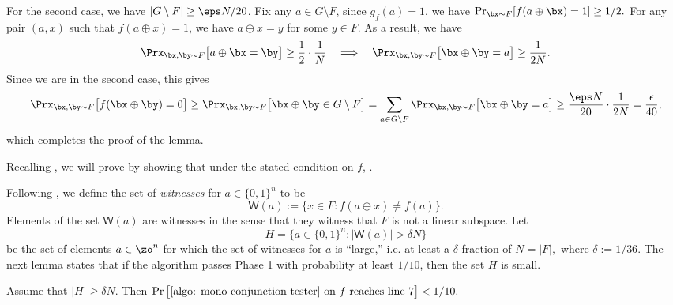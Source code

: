 \documentclass[11pt]{article}
\theoremstyle{definition}
\begin{document}
\begin{proofof}{}
For the second case, we have $|G \setminus F | \geq \eps N / 20$. Fix any $a \in G \setminus F $, since $g_f(a)=1$, we have $\Pr_{\bx \sim F}[f(a \oplus \bx )=1] \geq 1/2.$
For any pair $(a,x)$ such that $f(a\oplus x )=1$, we have $a \oplus x =y$ for some $y \in F$. As a result, we have
\[
\Prx_{\bx,\by \sim F}\big[a \oplus \bx  = \by\big] \geq {\frac 1 2} \cdot {\frac 1 N}\quad\Longrightarrow\quad
\Prx_{\bx,\by \sim F}\big[\bx \oplus \by = a \big] \geq \frac{1}{2N}.
\]
Since we are in the second case, this gives
\[
\Prx_{\bx,\by \sim F}\big[f(\bx \oplus \by )=0 \big]
\ge \Prx_{\bx,\by \sim F}\big[ \bx \oplus \by\in G\setminus F\big]
=\sum_{a \in G \setminus F }\Prx_{\bx,\by \sim F}\big[\bx \oplus \by = a \big] \geq {\frac {\eps N} {20}}\cdot {\frac 1 {2N}}  = \frac{\epsilon}{40},
\]
which completes the proof of the lemma.
\end{proofof}


























Recalling , we will prove  by showing that under the stated condition on $f$,
.






\def\W{\mathsf{W}}
Following \cite{PRS02},  we define the set of \emph{witnesses}  for $a \in \{0,1\}^n$ to be
$$
\W(a):=\big\{x \in F: f(a\oplus x ) \neq f(a)\big\}.
$$
Elements of the set $\W(a)$ are witnesses in the sense that they witness that $F$ is not a linear subspace. 
Let 
$$H = \big\{a \in \{0,1\}^n :  |\W(a) | > \delta N\big\}$$
be the set of elements $a \in \zo^n$ for which the set of witnesses for $a$ is ``large,'' i.e. at least a $\delta$ fraction of $N=|F|,$ where $\delta:=1/36$.
The next lemma states that if the algorithm passes Phase 1 with probability at least $1/10$, then the set $H$ is small. 


\begin{lemma} \label{lem: H big we reject}
    Assume that $|H| \geq \delta  N$. 
Then $\Pr\big[\text{\Cref{algo: mono conjunction tester} on $f$ reaches line 7}\big] < 1/10.$
\end{lemma}
\end{document}
